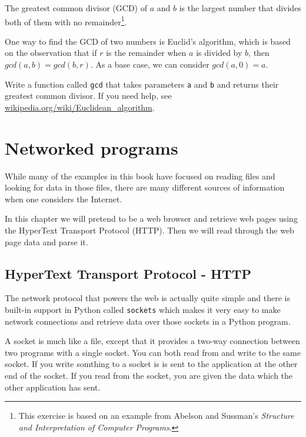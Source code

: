 \begin{ex}


The greatest common divisor (GCD) of $a$ and $b$ is the largest number
that divides both of them with no remainder\footnote{This exercise is
  based on an example from Abelson and Sussman's {\em Structure and
    Interpretation of Computer Programs}.}.

One way to find the GCD of two numbers is Euclid's algorithm,
which is based on the observation that if $r$ is the remainder
when $a$ is divided by $b$, then $gcd(a, b) = gcd(b, r)$.
As a base case, we can consider $gcd(a, 0) = a$.


Write a function called
\verb"gcd" that takes parameters {\tt a} and {\tt b}
and returns their greatest common divisor.  If you need
help, see \url{wikipedia.org/wiki/Euclidean_algorithm}.

\end{ex}





\chapter{Networked programs}

While many of the examples in this book have focused on reading
files and looking for data in those files, there are many different
sources of information when one considers the Internet.

In this chapter we will pretend to be a web browser and retrieve web
pages using the HyperText Transport Protocol (HTTP).  Then we will read
through the web page data and parse it.

\section{HyperText Transport Protocol - HTTP}

The network protocol that powers the web is actually quite simple and 
there is built-in support in Python called {\tt sockets} which makes it very 
easy to make network connections and retrieve data over those
sockets in a Python program.

A socket is much like a file, except that it provides a two-way connection between two 
programs with a single socket.  
You can both read from and write to the same socket.  If you write somthing to 
a socket is is sent to the application at the other end of the socket.  If you 
read from the socket, you are given the data which the other application has sent.

